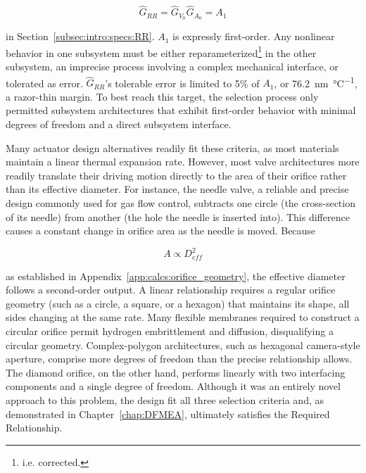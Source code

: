 \documentclass[12pt, letterpaper]{report}%
\newcounter{mycounter}           %
\newcounter{sub}[mycounter]      %
\begin{document}
			\begin{equation*}
				\hat{G}_{RR} = \hat{G}_{V_0} \hat{G}_{A_0} = A_1
			\end{equation*}

			in Section~\ref{subsec:intro:specs:RR}. $A_1$ is expressly first-order. Any nonlinear behavior in one subsystem must be either reparameterized\footnote{i.e. corrected.} in the other subsystem, an imprecise process involving a complex mechanical interface, or tolerated as error.
			$\hat{G}_{RR}$'s tolerable error is limited to 5\% of $A_1$, or \SI{76.2}{\nano\meter\per\celsius}, a razor-thin margin.
			To best reach this target, the selection process only permitted subsystem architectures that exhibit first-order behavior with minimal degrees of freedom and a direct subsystem interface.
			
			Many actuator design alternatives readily fit these criteria, as most materials maintain a linear thermal expansion rate.
			However, most valve architectures more readily translate their driving motion directly to the area of their orifice rather than its effective diameter.
			For instance, the needle valve, a reliable and precise design commonly used for gas flow control, subtracts one circle (the cross-section of its needle) from another (the hole the needle is inserted into).
			This difference causes a constant change in orifice area as the needle is moved.
			Because

			\begin{equation*}
				A \propto D_{eff}^2
			\end{equation*}

			as established in Appendix~\ref{app:calcs:orifice_geometry}, the effective diameter follows a second-order output.
			A linear relationship requires a regular orifice geometry (such as a circle, a square, or a hexagon) that maintains its shape, all sides changing at the same rate.
			Many flexible membranes required to construct a circular orifice permit hydrogen embrittlement and diffusion, disqualifying a circular geometry.
			Complex-polygon architectures, such as hexagonal camera-style aperture, comprise more degrees of freedom than the precise relationship allows.
			The diamond orifice, on the other hand, performs linearly with two interfacing components and a single degree of freedom.
			Although it was an entirely novel approach to this problem, the design fit all three selection criteria and, as demonstrated in Chapter~\ref{chap:DFMEA}, ultimately satisfies the Required Relationship.
\end{document}
